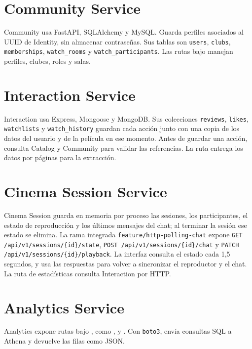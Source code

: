 \section{Community Service}
Community usa FastAPI, SQLAlchemy y MySQL. Guarda perfiles asociados al UUID de Identity, sin almacenar contraseñas. Sus tablas son \texttt{users}, \texttt{clubs}, \texttt{memberships}, \texttt{watch\_rooms} y \texttt{watch\_participants}. Las rutas bajo  manejan perfiles, clubes, roles y salas.
\section{Interaction Service}
Interaction usa Express, Mongoose y MongoDB. Sus colecciones \texttt{reviews}, \texttt{likes}, \texttt{watchlists} y \texttt{watch\_history} guardan cada acción junto con una copia de los datos del usuario y de la película en ese momento. Antes de guardar una acción, consulta Catalog y Community para validar las referencias. La ruta  entrega los datos por páginas para la extracción.
\section{Cinema Session Service}
Cinema Session guarda en memoria por proceso las sesiones, los participantes, el estado de reproducción y los últimos mensajes del chat; al terminar la sesión ese estado se elimina. La rama integrada \texttt{feature/http-polling-chat} expone \texttt{GET /api/v1/sessions/\{id\}/state}, \texttt{POST /api/v1/sessions/\{id\}/chat} y \texttt{PATCH /api/v1/sessions/\{id\}/playback}. La interfaz consulta el estado cada 1,5 segundos, y usa las respuestas para volver a sincronizar el reproductor y el chat. La ruta de estadísticas consulta Interaction por HTTP.
\section{Analytics Service}
Analytics expone rutas bajo , como ,  y . Con \texttt{boto3}, envía consultas SQL a Athena y devuelve las filas como JSON.
